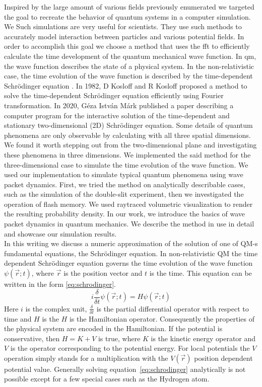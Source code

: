 Inspired by the large amount of various fields previously enumerated we targeted the goal to recreate the behavior of quantum systems in a computer simulation.
We 
Such simulations are very useful for scientists. They use such methods to accurately model interaction between particles and various potential fields.
In order to accomplish this goal we choose a method that uses the \acrfull{fft} to efficiently calculate the time development of the quantum mechanical wave function.
In \acrshort{qm}, the wave function describes the state of a physical system. In the non-relativistic case, the time evolution of the wave function is described by the time-dependent Schrödinger equation \cite{schrodinger1926}.
In 1982, D Kosloff and R Kosloff proposed a method \cite{KOSLOFF198335} to solve the time-dependent Schrödinger equation efficiently using Fourier transformation. In 2020, Géza István Márk published a paper \cite{mark2020webschrodinger} describing a computer program for the interactive solution of the time-dependent and stationary two-dimensional (2D) Schrödinger equation. Some details of quantum phenomena are only observable by calculating with all three spatial dimensions. We found it worth stepping out from the two-dimensional plane and investigating these phenomena in three dimensions. We implemented the said method for the three-dimensional case to simulate the time evolution of the wave function. We used our implementation to simulate typical quantum phenomena using wave packet dynamics. First, we tried the method on analytically describable cases, such as the simulation of the double-slit experiment, then we investigated the operation of flash memory. We used raytraced volumetric visualization to render the resulting probability density. In our work, we introduce the basics of wave packet dynamics in quantum mechanics. We describe the method in use in detail and showcase our simulation results.\\

In this writing we discuss a numeric approximation of the solution of one of QM-s fundamental equations,
the Schrödinger equation.
In non-relativistic QM the time dependent Schrödinger equation \cite{schrodinger1926} governs the time evolution of the wave function $\psi(\vec{r}; t)$, where $\vec{r}$ is the position vector and $t$ is the time.
This equation can be written in the form \ref{eq:schrodinger}.
\begin{equation}
	\label{eq:schrodinger}
	i\frac{\delta}{\delta{}t}\psi(\vec{r}; t) = H \psi(\vec{r}; t)
\end{equation}
Here $i$ is the complex unit, $\frac{\delta}{\delta{}t}$ is the partial differential operator with respect to time and $H$ is the $H$ is the Hamiltonian operator.
Consequently the properties of the physical system are encoded in the Hamiltonian.
If the potential is conservative, then $H = K + V$ is true, where $K$ is the kinetic energy operator and $V$ is the operator corresponding to the potential energy.
For local potentials the $V$ operation simply stands for a multiplication with the $V(\vec{r})$ position dependent potential value.
Generally solving equation~\ref{eq:schrodinger} analytically is not possible except for a few special cases such as the Hydrogen atom.


